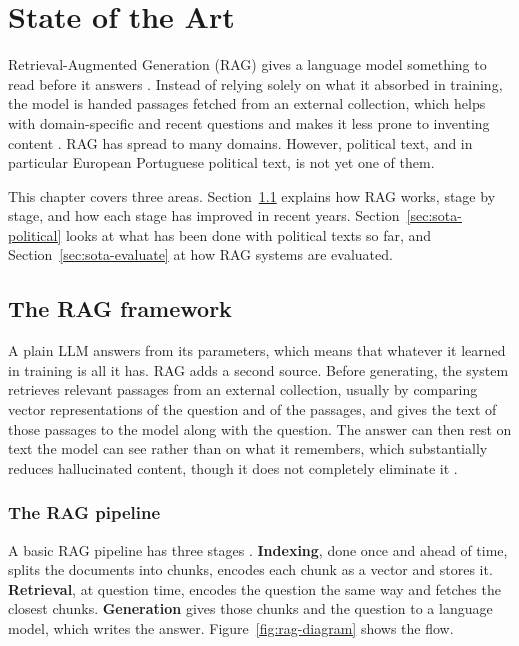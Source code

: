 \chapter{State of the Art} \label{ch:sota}

Retrieval-Augmented Generation (RAG) gives a language model something to read before it answers \citep{rag-nlp}. Instead of relying solely on what it absorbed in training, the model is handed passages fetched from an external collection, which helps with domain-specific and recent questions and makes it less prone to inventing content \citep{rag-survey, zhang2023sirenssongaiocean}. RAG has spread to many domains. However, political text, and in particular European Portuguese political text, is not yet one of them.

This chapter covers three areas. Section~\ref{sec:sota-rag} explains how RAG works, stage by stage, and how each stage has improved in recent years. Section~\ref{sec:sota-political} looks at what has been done with political texts so far, and Section~\ref{sec:sota-evaluate} at how RAG systems are evaluated.

\section{The RAG framework} \label{sec:sota-rag}

A plain LLM answers from its parameters, which means that whatever it learned in training is all it has. RAG adds a second source. Before generating, the system retrieves relevant passages from an external collection, usually by comparing vector representations of the question and of the passages, and gives the text of those passages to the model along with the question. The answer can then rest on text the model can see rather than on what it remembers, which substantially reduces hallucinated content, though it does not completely eliminate it \citep{rag-nlp, zhang2023sirenssongaiocean}.

\subsection{The RAG pipeline} \label{subsec:sota-pipeline}

A basic RAG pipeline has three stages \citep{rag-survey}. \textbf{Indexing}, done once and ahead of time, splits the documents into chunks, encodes each chunk as a vector and stores it. \textbf{Retrieval}, at question time, encodes the question the same way and fetches the closest chunks. \textbf{Generation} gives those chunks and the question to a language model, which writes the answer. Figure~\ref{fig:rag-diagram} shows the flow.

